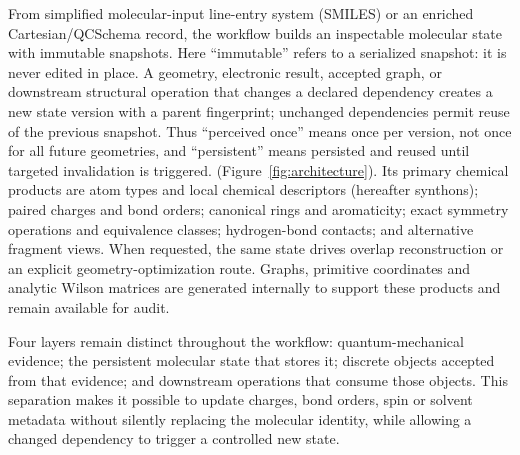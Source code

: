 \documentclass[journal=jctcce,manuscript=article]{achemso}
\newcommand{\rev}[1]{#1}
\begin{document}
From simplified molecular-input line-entry system (SMILES) or an enriched Cartesian/QCSchema record, the workflow builds an
inspectable molecular state with immutable snapshots.  \rev{Here
``immutable'' refers to a serialized snapshot: it is never edited in place.
A geometry, electronic result, accepted graph, or downstream structural
operation that changes a declared dependency creates a new state version with
a parent fingerprint; unchanged dependencies permit reuse of the previous
snapshot.  Thus ``perceived once'' means once per version, not once for all
future geometries, and ``persistent'' means persisted and reused until
targeted invalidation is triggered.}
(Figure~\ref{fig:architecture}).  Its primary chemical products are atom types
and local chemical descriptors (hereafter synthons);\cite{synthon_2024}
paired charges and bond orders; canonical rings and
aromaticity; exact symmetry operations and equivalence classes; hydrogen-bond
contacts; and alternative fragment views.  When requested, the same state
drives overlap reconstruction or an explicit geometry-optimization route.
Graphs, primitive coordinates and analytic Wilson matrices are generated
internally to support these products and remain available for audit.

Four layers remain distinct throughout the workflow: quantum-mechanical
evidence; the persistent molecular state that stores it; discrete objects
accepted from that evidence; and downstream operations that consume those
objects.  This separation makes it possible to update charges, bond orders,
spin or solvent metadata without silently replacing the molecular identity,
while allowing a changed dependency to trigger a controlled new state.
\end{document}
